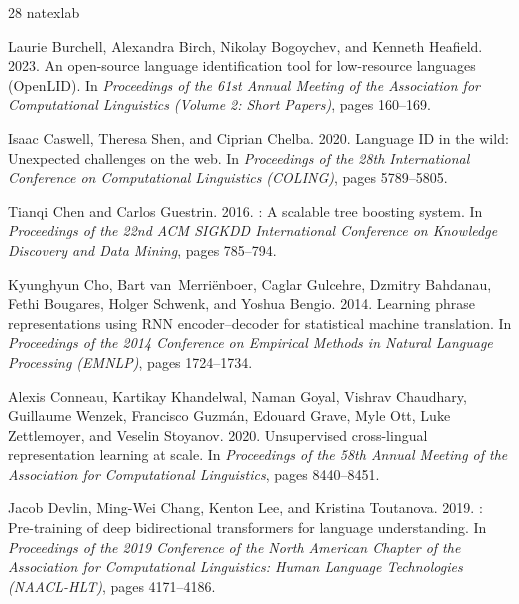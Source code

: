 \documentclass[11pt]{article}
\begin{document}
\begin{thebibliography}{28}
\expandafter\ifx\csname natexlab\endcsname\relax\def\natexlab#1{#1}\fi

Laurie Burchell, Alexandra Birch, Nikolay Bogoychev, and Kenneth Heafield. 2023.
\newblock An open-source language identification tool for low-resource languages ({OpenLID}).
\newblock In {\em Proceedings of the 61st Annual Meeting of the Association for Computational Linguistics (Volume 2: Short Papers)}, pages 160--169.

Isaac Caswell, Theresa Shen, and Ciprian Chelba. 2020.
\newblock Language {ID} in the wild: Unexpected challenges on the web.
\newblock In {\em Proceedings of the 28th International Conference on Computational Linguistics (COLING)}, pages 5789--5805.

Tianqi Chen and Carlos Guestrin. 2016.
: A scalable tree boosting system.
\newblock In {\em Proceedings of the 22nd ACM SIGKDD International Conference on Knowledge Discovery and Data Mining}, pages 785--794.

Kyunghyun Cho, Bart van~Merri{\"e}nboer, Caglar Gulcehre, Dzmitry Bahdanau, Fethi Bougares, Holger Schwenk, and Yoshua Bengio. 2014.
\newblock Learning phrase representations using {RNN} encoder--decoder for statistical machine translation.
\newblock In {\em Proceedings of the 2014 Conference on Empirical Methods in Natural Language Processing (EMNLP)}, pages 1724--1734.

Alexis Conneau, Kartikay Khandelwal, Naman Goyal, Vishrav Chaudhary, Guillaume Wenzek, Francisco Guzm{\'a}n, Edouard Grave, Myle Ott, Luke Zettlemoyer, and Veselin Stoyanov. 2020.
\newblock Unsupervised cross-lingual representation learning at scale.
\newblock In {\em Proceedings of the 58th Annual Meeting of the Association for Computational Linguistics}, pages 8440--8451.

Jacob Devlin, Ming-Wei Chang, Kenton Lee, and Kristina Toutanova. 2019.
: Pre-training of deep bidirectional transformers for language understanding.
\newblock In {\em Proceedings of the 2019 Conference of the North American Chapter of the Association for Computational Linguistics: Human Language Technologies (NAACL-HLT)}, pages 4171--4186.


\end{thebibliography}
\end{document}
